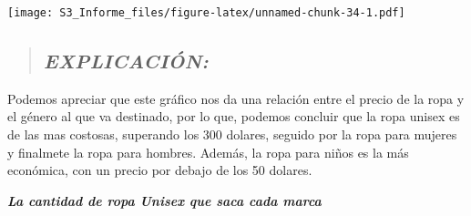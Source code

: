 \documentclass[
]{article}
\newenvironment{Shaded}{\begin{snugshade}}{\end{snugshade}}
\newcommand{\AttributeTok}[1]{\textcolor[rgb]{0.77,0.63,0.00}{#1}}
\newcommand{\FunctionTok}[1]{\textcolor[rgb]{0.00,0.00,0.00}{#1}}
\newcommand{\NormalTok}[1]{#1}
\newcommand{\SpecialCharTok}[1]{\textcolor[rgb]{0.00,0.00,0.00}{#1}}
\newcommand{\StringTok}[1]{\textcolor[rgb]{0.31,0.60,0.02}{#1}}
\begin{document}
\begin{Shaded}
\end{Shaded}

\texttt{[image: S3\_Informe\_files/figure-latex/unnamed-chunk-34-1.pdf]}

\begin{quote}
\hypertarget{explicaciuxf3n-10}{%
\subsection{\texorpdfstring{\textbf{\emph{EXPLICACIÓN:}}}{EXPLICACIÓN:}}\label{explicaciuxf3n-10}}
\end{quote}

Podemos apreciar que este gráfico nos da una relación entre el precio de
la ropa y el género al que va destinado, por lo que, podemos concluir
que la ropa unisex es de las mas costosas, superando los 300 dolares,
seguido por la ropa para mujeres y finalmete la ropa para hombres.
Además, la ropa para niños es la más económica, con un precio por debajo
de los 50 dolares.

\textbf{\emph{La cantidad de ropa Unisex que saca cada marca}}
\end{document}
